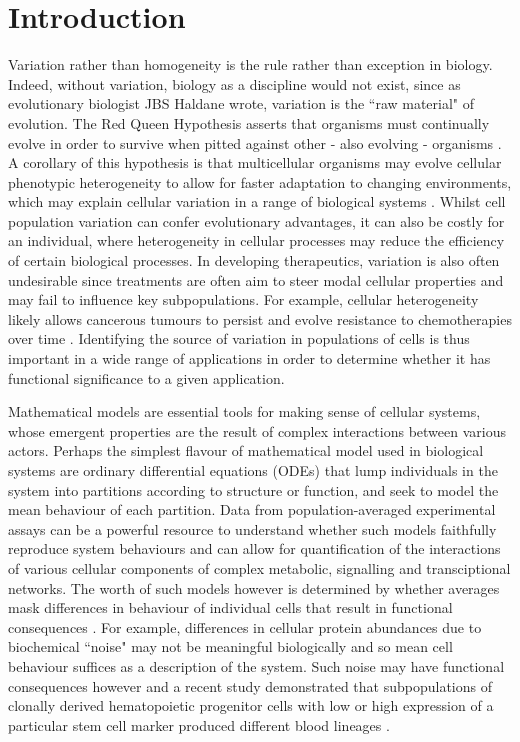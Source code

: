 \documentclass[10pt,letterpaper]{article}
\begin{document}
\section{Introduction}
Variation rather than homogeneity is the rule rather than exception in biology. Indeed, without variation, biology as a discipline would not exist, since as evolutionary biologist JBS Haldane wrote, variation is the ``raw material" of evolution. The Red Queen Hypothesis asserts that organisms must continually evolve in order to survive when pitted against other - also evolving - organisms \cite{ridley1994red}. A corollary of this hypothesis is that multicellular organisms may evolve cellular phenotypic heterogeneity to allow for faster adaptation to changing environments, which may explain cellular variation in a range of biological systems \cite{fraser2009chance}. Whilst cell population variation can confer evolutionary advantages, it can also be costly for an individual, where heterogeneity in cellular processes may reduce the efficiency of certain biological processes. In developing therapeutics, variation is also often undesirable since treatments are often aim to steer modal cellular properties and may fail to influence key subpopulations. For example, cellular heterogeneity likely allows cancerous tumours to persist \cite{gatenby2007cellular} and evolve resistance to chemotherapies over time \cite{altrock2015mathematics}. Identifying the source of variation in populations of cells is thus important in a wide range of applications in order to determine whether it has functional significance to a given application.

Mathematical models are essential tools for making sense of cellular systems, whose emergent properties are the result of complex interactions between various actors. Perhaps the simplest flavour of mathematical model used in biological systems are ordinary differential equations (ODEs) that lump individuals in the system into partitions according to structure or function, and seek to model the mean behaviour of each partition. Data from population-averaged experimental assays can be a powerful resource to understand whether such models faithfully reproduce system behaviours and can allow for quantification of the interactions of various cellular components of complex metabolic, signalling and transciptional networks. The worth of such models however is determined by whether averages mask differences in behaviour of individual cells that result in functional consequences \cite{altschuler2010cellular}. For example, differences in cellular protein abundances due to biochemical ``noise" may not be meaningful biologically \cite{elowitz2002stochastic} and so mean cell behaviour suffices as a description of the system. Such noise may have functional consequences however and a recent study demonstrated that subpopulations of clonally derived hematopoietic progenitor cells with low or high expression of a particular stem cell marker produced different blood lineages \cite{chang2008transcriptome}. 
\end{document}
